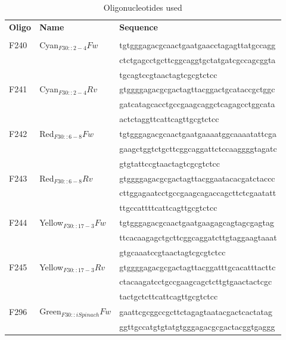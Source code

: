 \begin{table}[ht]
\caption{Oligonucleotides used\\}
\label{table:331}%
{%
\begin{tabular*}{\columnwidth}{@{}lll@{}}
\hline
\textbf{Oligo} & \textbf{Name} & \textbf{Sequence}
\\
\\
\hline
F240 & Cyan$_{F30::2-4}Fw$ &  \MakeLowercase{TGTGGGAGACGCAACTGAATGAACCTAGAGTTATGCCAGG}
\\
& & \MakeLowercase{CTCTGAGCCTGCTTCGGCAGGTGCTATGATCGCCAGCGGTA}
\\
& & \MakeLowercase{TGCAGTCCGTAACTAGTCGCGTCTCC}
\\
F241 & Cyan$_{F30::2-4}Rv$ &  \MakeLowercase{GTGGGGAGACGCGACTAGTTACGGACTGCATACCGCTGGC}
\\
& & \MakeLowercase{GATCATAGCACCTGCCGAAGCAGGCTCAGAGCCTGGCATA}
\\
& & \MakeLowercase{ACTCTAGGTTCATTCAGTTGCGTCTCC}
\\
F242 & 	Red$_{F30::6-8}Fw$ &  \MakeLowercase{TGTGGGagacgcaactgaatgaaaatggcaaaatattcga}
\\
 & &  \MakeLowercase{gaagctggtctgcttcggcaggattctccaaggggtagatc}
\\
& & \MakeLowercase{gtgtattccgtaactagtcgcgtcTCC}
\\
F243 & Red$_{F30::6-8}Rv$ &  \MakeLowercase{GTGGGgagacgcgactagttacggaatacacgatctaccc}
\\
& & \MakeLowercase{cttggagaatcctgccgaagcagaccagcttctcgaatatt}
\\
& & \MakeLowercase{ttgccattttcattcagttgcgtcTCC}
\\
F244 & Yellow$_{F30::17-3}Fw$ &  \MakeLowercase{TGTGGGagacgcaactgaatgaagagcagtagcgagtag}
\\
& & \MakeLowercase{ttcacaagagctgcttcggcaggatcttgtaggaagtaaat}
\\
& & \MakeLowercase{gtgcaaatccgtaactagtcgcgtctcC}
\\
F245 & Yellow$_{F30::17-3}Rv$ &  \MakeLowercase{GTGGGgagacgcgactagttacggatttgcacatttacttc}
\\
& & \MakeLowercase{ctacaagatcctgccgaagcagctcttgtgaactactcgc}
\\
& & \MakeLowercase{tactgctcttcattcagttgcgtctCC}
\\
F296 & Green$_{F30::iSpinach}Fw$ &  \MakeLowercase{gaattcgcggccgcttCTAGAGTAATACGACTCACTATAG}
\\
&  &  \MakeLowercase{GGTTGCCATGTGTATGTGGGAGACGCGACTACGGTGAGGG}

\end{tabular*}}
\end{table}
